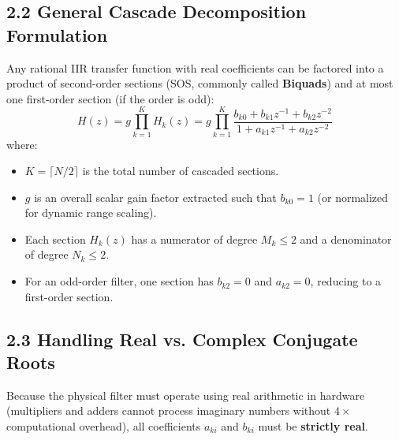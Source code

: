 \documentclass[11pt,a4paper]{article}
\begin{document}
\subsection{2.2 General Cascade Decomposition Formulation}
Any rational IIR transfer function with real coefficients can be factored into a product of second-order sections (SOS, commonly called \textbf{Biquads}) and at most one first-order section (if the order is odd):
\begin{equation}
H(z) = g \prod_{k=1}^{K} H_k(z) = g \prod_{k=1}^{K} \frac{b_{k0} + b_{k1} z^{-1} + b_{k2} z^{-2}}{1 + a_{k1} z^{-1} + a_{k2} z^{-2}}
\label{eq:cascade_product}
\end{equation}
where:
\begin{itemize}
    \item $K = \lceil N/2 \rceil$ is the total number of cascaded sections.
    \item $g$ is an overall scalar gain factor extracted such that $b_{k0} = 1$ (or normalized for dynamic range scaling).
    \item Each section $H_k(z)$ has a numerator of degree $M_k \le 2$ and a denominator of degree $N_k \le 2$.
    \item For an odd-order filter, one section has $b_{k2} = 0$ and $a_{k2} = 0$, reducing to a first-order section.
\end{itemize}

\subsection{2.3 Handling Real vs. Complex Conjugate Roots}
Because the physical filter must operate using real arithmetic in hardware (multipliers and adders cannot process imaginary numbers without $4\times$ computational overhead), all coefficients $a_{ki}$ and $b_{ki}$ must be \textbf{strictly real}.
\end{document}
